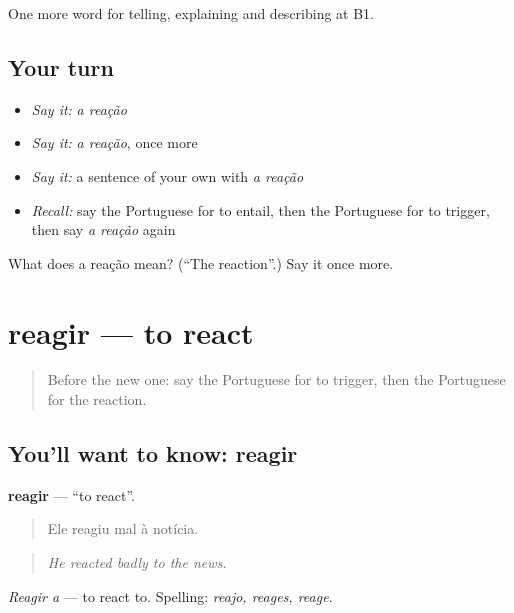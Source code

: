 \begin{grammarlens}[title={What you've built}]
One more word for telling, explaining and describing at B1.
\end{grammarlens}

\subsection*{Your turn}
\begin{itemize}
\raggedright
  \item \emph{Say it:} \emph{a reação}
  \item \emph{Say it:} \emph{a reação}, once more
  \item \emph{Say it:} a sentence of your own with \emph{a reação}
  \item \emph{Recall:} say the Portuguese for to entail, then the Portuguese for to trigger, then say \emph{a reação} again
\end{itemize}

\begin{tcolorbox}[breakable,colback=teal!4,colframe=teal!35!black,title={Before you move on}]
What does a reação mean? (\textquotedblleft{}The reaction\textquotedblright{}.) Say it once more.
\end{tcolorbox}
\section[reagir]{reagir — to react}

\label{lesson:PT-C352-reagir}



\begin{quote}
Before the new one: say the Portuguese for to trigger, then the Portuguese for the reaction.
\end{quote}

\subsection*{You'll want to know: reagir}
\textbf{reagir} — \textquotedblleft{}to react\textquotedblright{}.

\begin{quote}
Ele reagiu mal à notícia.
\end{quote}

\begin{quote}
\emph{He reacted badly to the news.}
\end{quote}

\emph{Reagir a} — to react to. Spelling: \emph{reajo, reages, reage}.

